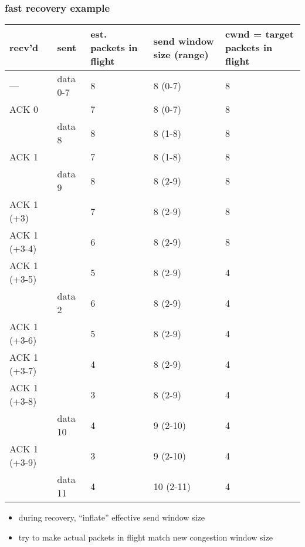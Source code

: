 \begin{frame}
\frametitle{fast recovery example}
{\fontsize{9}{10}\selectfont
\begin{tabular}{lllll}
recv'd & sent & est. packets in flight & send window size (range) & cwnd = target packets in flight\\ \hline
--- & data 0-7 & 8 & 8 (0-7) & 8\\
ACK 0 & ~ & 7 & 8 (0-7) & 8 \\
~ & data 8 & 8 & 8 (1-8) & 8\\
ACK 1 & ~ & 7  & 8 (1-8) & 8\\
~ & data 9 & 8 & 8 (2-9) & 8\\
ACK 1 (+3)& ~  & 7 & 8 (2-9) & 8\\
ACK 1 (+3-4)& ~  & 6 & 8 (2-9) & 8\\
ACK 1 (+3-5)& ~ & 5 &  8 (2-9) & 4 \\
~ & data 2 & 6 & 8 (2-9) & 4\\
ACK 1 (+3-6)& ~ & 5 &  8 (2-9) & 4 \\
ACK 1 (+3-7)& ~ & 4 &  8 (2-9) & 4 \\
ACK 1 (+3-8)& ~ & 3 &  8 (2-9) & 4 \\
~ & data 10 & 4 & 9 (2-10) & 4\\
ACK 1 (+3-9)& ~ & 3 &  9 (2-10) & 4 \\
~ & data 11 & 4 &  10 (2-11) & 4 \\
\end{tabular}
}
\begin{itemize}
    \item during recovery, ``inflate'' effective send window size
    \item try to make actual packets in flight match new congestion window size
\end{itemize}
\end{frame}
